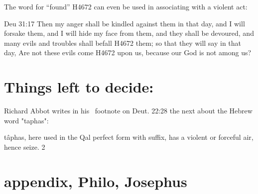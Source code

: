 \documentclass[11pt]{article}
\begin{document}
The word for “found” H4672 can even be used in associating with a violent act:

Deu 31:17
Then my anger shall be kindled against them in that day, and I will forsake them, and I will hide my face from them, and they shall be devoured, and many evils and troubles shall befall H4672 them; so that they will say in that day, Are not these evils come H4672 upon us, because our God is not among us?



\section{Things left to decide:}

Richard Abbot writes in his  footnote on Deut. 22:28 the next about the Hebrew word "taphas": 

tâphas, here used in the Qal perfect form with suffix, has a violent or forceful air, hence seize. 2


\section{appendix, Philo, Josephus}
\end{document}
